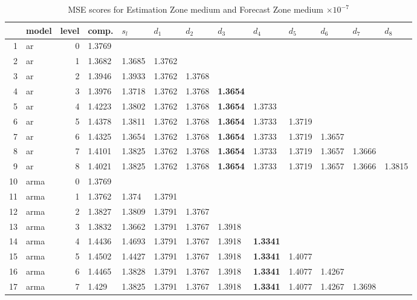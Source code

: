 \documentclass[10pt,a4paper]{article}
\begin{document}
\begin{table}[ht]
\centering
\caption{MSE scores for Estimation Zone medium and Forecast Zone medium $ \times 10^{-7}$} 
\begin{tabular}{rlrllllllllll}
  \hline
 & model & level & comp. & $s_l$ & $d_1$ & $d_2$ & $d_3$ & $d_4$ & $d_5$ & $d_6$ & $d_7$ & $d_8$ \\ 
  \hline
1 & ar &     0 & 1.3769 &  &  &  &  &  &  &  &  &  \\ 
  2 & ar &     1 & 1.3682 & 1.3685 & 1.3762 &  &  &  &  &  &  &  \\ 
  3 & ar &     2 & 1.3946 & 1.3933 & 1.3762 & 1.3768 &  &  &  &  &  &  \\ 
  4 & ar &     3 & 1.3976 & 1.3718 & 1.3762 & 1.3768 & \textbf{1.3654} &  &  &  &  &  \\ 
  5 & ar &     4 & 1.4223 & 1.3802 & 1.3762 & 1.3768 & \textbf{1.3654} & 1.3733 &  &  &  &  \\ 
  6 & ar &     5 & 1.4378 & 1.3811 & 1.3762 & 1.3768 & \textbf{1.3654} & 1.3733 & 1.3719 &  &  &  \\ 
  7 & ar &     6 & 1.4325 & 1.3654 & 1.3762 & 1.3768 & \textbf{1.3654} & 1.3733 & 1.3719 & 1.3657 &  &  \\ 
  8 & ar &     7 & 1.4101 & 1.3825 & 1.3762 & 1.3768 & \textbf{1.3654} & 1.3733 & 1.3719 & 1.3657 & 1.3666 &  \\ 
  9 & ar &     8 & 1.4021 & 1.3825 & 1.3762 & 1.3768 & \textbf{1.3654} & 1.3733 & 1.3719 & 1.3657 & 1.3666 & 1.3815 \\ 
   \hline
10 & arma &     0 & 1.3769 &  &  &  &  &  &  &  &  &  \\ 
  11 & arma &     1 & 1.3762 & 1.374 & 1.3791 &  &  &  &  &  &  &  \\ 
  12 & arma &     2 & 1.3827 & 1.3809 & 1.3791 & 1.3767 &  &  &  &  &  &  \\ 
  13 & arma &     3 & 1.3832 & 1.3662 & 1.3791 & 1.3767 & 1.3918 &  &  &  &  &  \\ 
  14 & arma &     4 & 1.4436 & 1.4693 & 1.3791 & 1.3767 & 1.3918 & \textbf{1.3341} &  &  &  &  \\ 
  15 & arma &     5 & 1.4502 & 1.4427 & 1.3791 & 1.3767 & 1.3918 & \textbf{1.3341} & 1.4077 &  &  &  \\ 
  16 & arma &     6 & 1.4465 & 1.3828 & 1.3791 & 1.3767 & 1.3918 & \textbf{1.3341} & 1.4077 & 1.4267 &  &  \\ 
  17 & arma &     7 & 1.429 & 1.3825 & 1.3791 & 1.3767 & 1.3918 & \textbf{1.3341} & 1.4077 & 1.4267 & 1.3698 &  \\ 

\end{tabular}
\end{table}
\end{document}
